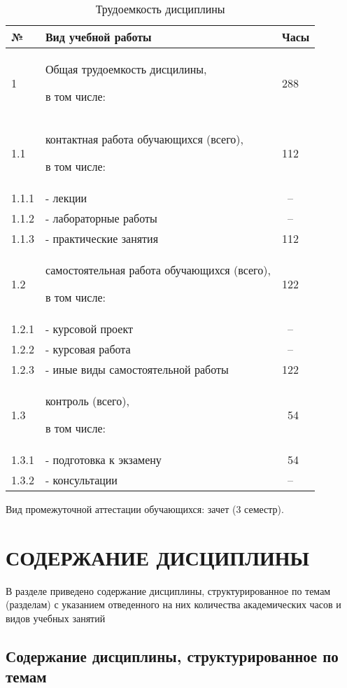 \begin{table}
  \caption{Трудоемкость дисциплины}
  \label{tblHours}  
  \begin{tabularx}{\textwidth}{p{} X p{}}
  \toprule  
  № & Вид учебной работы & Часы\\
  \midrule   
  1 & Общая трудоемкость дисцилины,\par в том числе: & 288\\
  \midrule   
  1.1 & контактная работа обучающихся  (всего),\par в том числе: & 112\\  
  1.1.1 & - лекции & ~--\\    
  1.1.2 & - лабораторные работы & ~--\\  
  1.1.3 & - практические занятия & 112\\    
  \midrule   
  1.2 & самостоятельная работа обучающихся (всего),\par в том числе: & 122\\    
  1.2.1 & - курсовой проект & ~--\\      
  1.2.2 & - курсовая работа & ~--\\        
  1.2.3 & - иные виды самостоятельной работы & 122\\          
  \midrule     
  1.3 & контроль (всего),\par в том числе: & ~54\\    
  1.3.1 & - подготовка к экзамену & ~54\\
  1.3.2 & - консультации & ~--\\  
  \bottomrule  
  \end{tabularx}  
\end{table}

Вид промежуточной аттестации обучающихся: зачет (3 семестр).

\chapter{СОДЕРЖАНИЕ ДИСЦИПЛИНЫ}
\label{chapt4}

В разделе приведено содержание дисциплины, структурированное по темам (разделам) с указанием отведенного на них количества академических часов и видов учебных занятий

\section{Содержание дисциплины, структурированное по темам}

